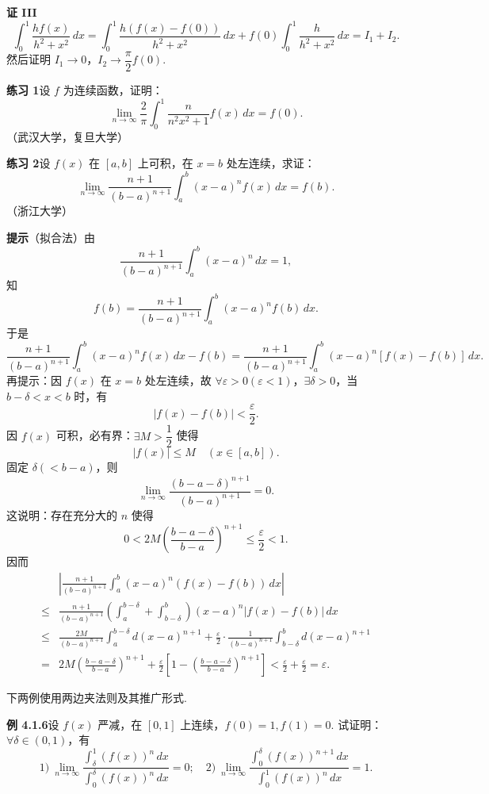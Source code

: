 \documentclass[UTF8,12pt,a4paper,fontset=fandol]{ctexart}
\begin{document}
\noindent\textbf{证 III}\quad
\[
\int_0^1\frac{hf(x)}{h^2+x^2}\,dx
=\int_0^1\frac{h(f(x)-f(0))}{h^2+x^2}\,dx
+f(0)\int_0^1\frac{h}{h^2+x^2}\,dx=I_1+I_2.
\]
然后证明 $I_1\to0$，$I_2\to\dfrac\pi2 f(0)$.

\noindent\textbf{练习 1}\quad 设 $f$ 为连续函数，证明：
\[
\lim_{n\to\infty}\frac2\pi\int_0^1\frac{n}{n^2x^2+1}f(x)\,dx=f(0).
\]
（武汉大学，复旦大学）

\noindent\textbf{练习 2}\quad 设 $f(x)$ 在 $[a,b]$ 上可积，在 $x=b$ 处左连续，求证：
\[
\lim_{n\to\infty}\frac{n+1}{(b-a)^{n+1}}\int_a^b(x-a)^n f(x)\,dx=f(b).
\]
（浙江大学）

\noindent\textbf{提示}\quad （拟合法）由
\[
\frac{n+1}{(b-a)^{n+1}}\int_a^b(x-a)^n\,dx=1,
\]
知
\[
f(b)=\frac{n+1}{(b-a)^{n+1}}\int_a^b(x-a)^n f(b)\,dx.
\]
于是
\[
\frac{n+1}{(b-a)^{n+1}}\int_a^b(x-a)^n f(x)\,dx-f(b)
=\frac{n+1}{(b-a)^{n+1}}\int_a^b(x-a)^n[f(x)-f(b)]\,dx.
\]
再提示：因 $f(x)$ 在 $x=b$ 处左连续，故 $\forall\varepsilon>0(\varepsilon<1)$，$\exists\delta>0$，当 $b-\delta<x<b$ 时，有
\[
|f(x)-f(b)|<\frac\varepsilon2.
\tag{1}
\]
因 $f(x)$ 可积，必有界：$\exists M>\dfrac12$ 使得
\[
|f(x)|\le M\quad(x\in[a,b]).
\tag{2}
\]
固定 $\delta(<b-a)$，则
\[
\lim_{n\to\infty}\frac{(b-a-\delta)^{n+1}}{(b-a)^{n+1}}=0.
\]
这说明：存在充分大的 $n$ 使得
\[
0<2M\left(\frac{b-a-\delta}{b-a}\right)^{n+1}\le\frac\varepsilon2<1.
\tag{3}
\]
因而
\[
\begin{aligned}
&\left|\frac{n+1}{(b-a)^{n+1}}\int_a^b(x-a)^n(f(x)-f(b))\,dx\right|\\
\le{}&\frac{n+1}{(b-a)^{n+1}}
\left(\int_a^{b-\delta}+\int_{b-\delta}^b\right)
(x-a)^n|f(x)-f(b)|\,dx\\
\le{}&\frac{2M}{(b-a)^{n+1}}\int_a^{b-\delta}d(x-a)^{n+1}
+\frac\varepsilon2\cdot\frac1{(b-a)^{n+1}}
\int_{b-\delta}^b d(x-a)^{n+1}\\
={}&2M\left(\frac{b-a-\delta}{b-a}\right)^{n+1}
+\frac\varepsilon2\left[1-\left(\frac{b-a-\delta}{b-a}\right)^{n+1}\right]
<\frac\varepsilon2+\frac\varepsilon2=\varepsilon.
\end{aligned}
\]

下两例使用两边夹法则及其推广形式.

\noindent\textbf{例 4.1.6}\quad 设 $f(x)$ 严减，在 $[0,1]$ 上连续，$f(0)=1,f(1)=0$. 试证明：$\forall\delta\in(0,1)$，有
\[
1)\ \lim_{n\to\infty}\frac{\displaystyle\int_\delta^1(f(x))^n\,dx}
{\displaystyle\int_0^\delta(f(x))^n\,dx}=0;
\quad
2)\ \lim_{n\to\infty}\frac{\displaystyle\int_0^\delta(f(x))^{n+1}\,dx}
{\displaystyle\int_0^1(f(x))^n\,dx}=1.
\]
\end{document}

